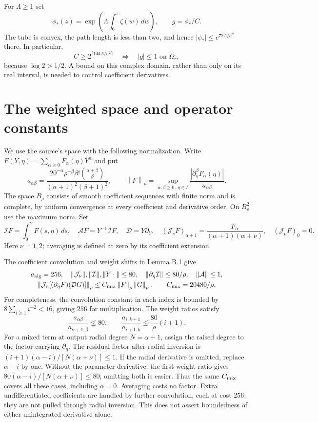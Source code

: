 \documentclass[11pt]{article}
\newcommand{\norm}[1]{\left\lVert#1\right\rVert_\rho}
\newcommand{\Av}{\mathcal A}
\newcommand{\DY}{\mathcal D}
\newcommand{\J}{\mathcal J}
\newcommand{\Int}{\mathcal I}
\begin{document}
For $\Lambda\ge1$ set
\[
\phi_*(z)=\exp\left(\Lambda\int_0^z\zeta(w)\,dw\right),\qquad
g=\phi_*/C.
\]
The tube is convex, the path length is less than two, and hence
$|\phi_*|\le e^{72\Lambda/\sigma^2}$ there. In particular,
\begin{equation}\label{Cchoice}
C\ge2^{\lceil144\Lambda/\sigma^2\rceil}
\quad\Longrightarrow\quad |g|\le1\text{ on }\Omega_r,
\end{equation}
because $\log2>1/2$. A bound on this complex domain, rather than only
on its real interval, is needed to control coefficient derivatives.

\section{The weighted space and operator constants}
We use the source's space with the following normalization. Write
$F(Y,\eta)=\sum_{\alpha\ge0}F_\alpha(\eta)Y^\alpha$ and put
\[
a_{\alpha\beta}=
\frac{20^{-\alpha}\rho^{-\beta}\beta!\binom{\alpha+\beta}{\beta}}
{(\alpha+1)^2(\beta+1)^2},\qquad
\norm{F}=\sup_{\alpha,\beta\ge0,\ \eta\in I}
\frac{|\partial_\eta^\beta F_\alpha(\eta)|}{a_{\alpha\beta}}.
\]
The space $B_\rho$ consists of smooth coefficient sequences with finite
norm and is complete, by uniform convergence at every coefficient and
derivative order. On $B_\rho^2$ use the maximum norm. Set
\[
\Int F=\int_0^Y F(s,\eta)\,ds,\quad \Av F=Y^{-1}\Int F,
\quad \DY=Y\partial_Y,
\quad (\J_\nu F)_{\alpha+1}=\frac{F_\alpha}{(\alpha+1)(\alpha+\nu)},
\quad (\J_\nu F)_0=0.
\]
Here $\nu=1,2$; averaging is defined at zero by its coefficient extension.

The coefficient convolution and weight shifts in Lemma B.1 give
\begin{equation}\label{ops}
\begin{gathered}
a_{\rm alg}=256,\quad \|\J_\nu\|,\|\Int\|,\|Y\cdot\|\le80,
\quad \|\partial_\eta\Int\|\le80/\rho,\quad \|\Av\|\le1,\\
\norm{\J_\nu[(\partial_\eta F)(\DY G)]}
\le C_{\rm mix}\norm{F}\norm{G},\qquad C_{\rm mix}=20480/\rho.
\end{gathered}
\end{equation}
For completeness, the convolution constant in each index is bounded by
$8\sum_{i\ge1}i^{-2}<16$, giving $256$ for multiplication.
The weight ratios satisfy
\[
\frac{a_{\alpha\beta}}{a_{\alpha+1,\beta}}\le80,
\qquad \frac{a_{i,k+1}}{a_{i+1,k}}\le\frac{80}{\rho}(i+1).
\]
For a mixed term at output radial degree $N=\alpha+1$, assign the
raised degree to the factor carrying $\partial_\eta$. The residual factor
after radial inversion is
$(i+1)(\alpha-i)/[N(\alpha+\nu)]\le1$. If the radial derivative is
omitted, replace $\alpha-i$ by one. Without the parameter derivative,
the first weight ratio gives $80(\alpha-i)/[N(\alpha+\nu)]\le80$;
omitting both is easier. Thus the same $C_{\rm mix}$ covers all these
cases, including $\alpha=0$. Averaging costs no factor. Extra
undifferentiated coefficients are handled by further convolution, each
at cost $256$; they are not pulled through radial inversion.
This does not assert boundedness of either unintegrated derivative alone.
\end{document}
